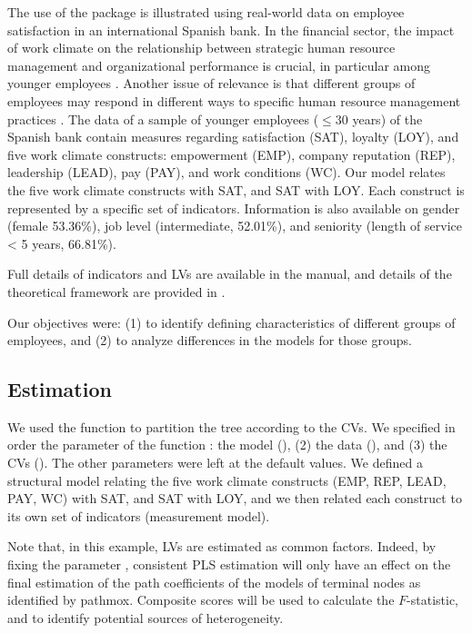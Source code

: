 The use of the  package is illustrated using real-world data on employee satisfaction in an international Spanish bank. In the financial sector, the impact of work climate on the relationship between strategic human resource management and organizational performance is crucial, in particular among younger employees \citep{Kollmann20}. Another issue of relevance is that different groups of employees may respond in different ways to specific human resource management practices \citep{Lamberti20}.
The data of a sample of younger employees ($\leq$30 years) of the Spanish bank contain measures regarding satisfaction (SAT), loyalty (LOY), and five work climate constructs: empowerment (EMP), company reputation (REP), leadership (LEAD), pay (PAY), and work conditions (WC). Our model relates the five work climate constructs with SAT, and SAT with LOY. Each construct is represented by a specific set of indicators. Information is also available on gender (female 53.36\%), job level (intermediate, 52.01\%), and seniority (length of service < 5 years, 66.81\%).  

Full details of indicators and LVs are available in the   manual, and details of the theoretical framework are provided in \citet{Lamberti20}.

Our objectives were: (1) to identify defining characteristics of different groups of employees, and (2) to analyze differences in the models for those groups.

 \subsection{Estimation}
 
We used the   function to partition the tree according to the CVs. We specified in order the parameter of the function :  the model (), (2) the data (), and  (3) the CVs ().  The other parameters  were left at the default values. We defined a structural model relating the five work climate constructs (EMP, REP,  LEAD, PAY, WC) with SAT, and SAT with LOY, and we then related each construct to its own set of indicators (measurement model). 

Note that, in this example, LVs are estimated as common factors. Indeed, by fixing the parameter , consistent PLS estimation \citep{Dijkstra15} will only have an effect on the final estimation of the path coefficients of the models of terminal nodes as identified by pathmox. Composite scores will be used to calculate the $F$-statistic, and to identify potential sources of heterogeneity.
 


